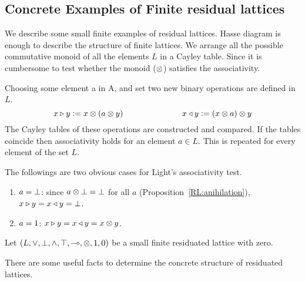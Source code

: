 \subsection{Concrete Examples of Finite residual lattices}

We describe some small finite examples of residual lattices. 
Hasse diagram is enough to describe the structure of finite lattices. 
We arrange all the possible commutative monoid
of all the elements $L$ in a Cayley table.
Since it is cumbersome to test 
whether the monoid ($\otimes$) satisfies the associativity.

\begin{definition} 
Choosing some element a in A, and set two new binary operations are defined in $L$. 
\[ x \triangleright  y \mathrel{\mathop:}=  x \otimes ( a \otimes y) \hskip 72pt
 x \triangleleft y \mathrel{\mathop:}=  (x \otimes a) \otimes y \]
 The Cayley tables of these operations are constructed and compared. 
If the tables coincide then associativity holds for an element $a \in L$. 
This is repeated for every element of the set $L$. 
 \end{definition}
 
The followings are two obvious cases for Light's associativity test.
\begin {enumerate}
\item 
{\em $a = \bot$}:
since $a \otimes \bot = \bot$ for all $a$ (Proposition~\ref{RL:anihilation}), 
$x \triangleright  y  = x \triangleleft  y = \bot$.
\item  
{\em $a = \mbox{\boldmath{1}}$}:  $x \triangleright  y  = x \triangleleft  y = x \otimes y$.  
\end{enumerate}

Let $(L,\vee,\bot,\wedge,\top,\multimap,\otimes,\mbox{\boldmath{1}},\mbox{\boldmath{0}})$ be a small finite
residuated lattice with zero. 

There are some useful facts to determine the concrete structure of residuated lattices. 

